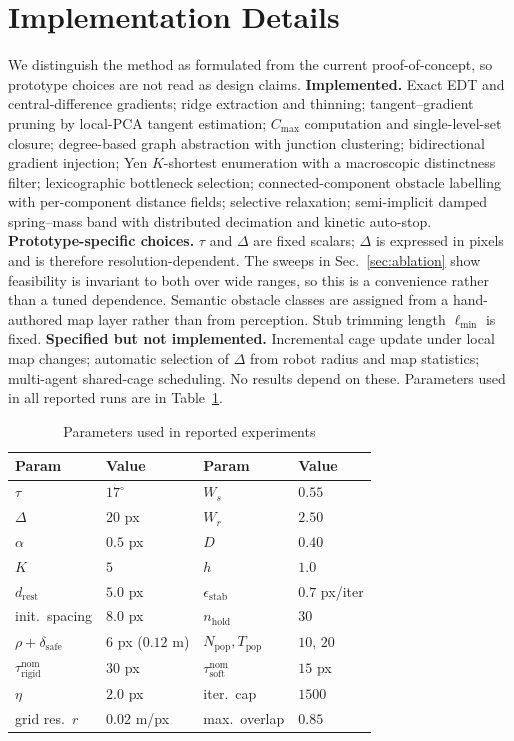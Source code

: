 \documentclass[conference]{IEEEtran}
\begin{document}
\section{Implementation Details}
\label{sec:impl}
We distinguish the method as formulated from the current proof-of-concept, so prototype choices are not read as design claims.
\textbf{Implemented.} Exact EDT and central-difference gradients; ridge extraction and thinning; tangent--gradient pruning by local-PCA tangent estimation; $C_{\max}$ computation and single-level-set closure; degree-based graph abstraction with junction clustering; bidirectional gradient injection; Yen $K$-shortest enumeration with a macroscopic distinctness filter; lexicographic bottleneck selection; connected-component obstacle labelling with per-component distance fields; selective relaxation; semi-implicit damped spring--mass band with distributed decimation and kinetic auto-stop.
\textbf{Prototype-specific choices.} $\tau$ and $\Delta$ are fixed scalars; $\Delta$ is expressed in pixels and is therefore resolution-dependent. The sweeps in Sec.~\ref{sec:ablation} show feasibility is invariant to both over wide ranges, so this is a convenience rather than a tuned dependence. Semantic obstacle classes are assigned from a hand-authored map layer rather than from perception. Stub trimming length $\ell_{\min}$ is fixed.
\textbf{Specified but not implemented.} Incremental cage update under local map changes; automatic selection of $\Delta$ from robot radius and map statistics; multi-agent shared-cage scheduling. No results depend on these.
Parameters used in all reported runs are in Table~\ref{tab:params}.
\begin{table}[htbp]
\caption{Parameters used in reported experiments}
\label{tab:params}
\begin{center}
\begin{tabular}{@{}llll@{}}
\toprule
\textbf{Param} & \textbf{Value} & \textbf{Param} & \textbf{Value} \\ \midrule
$\tau$ & $17^\circ$ & $W_s$ & $0.55$ \\
$\Delta$ & $20$ px & $W_r$ & $2.50$ \\
$\alpha$ & $0.5$ px & $D$ & $0.40$ \\
$K$ & $5$ & $h$ & $1.0$ \\
$d_{\mathrm{rest}}$ & $5.0$ px & $\epsilon_{\mathrm{stab}}$ & $0.7$ px/iter \\
init.\ spacing & $8.0$ px & $n_{\mathrm{hold}}$ & $30$ \\
$\rho+\delta_{\mathrm{safe}}$ & $6$ px ($0.12$ m) & $N_{\mathrm{pop}},T_{\mathrm{pop}}$ & $10,\,20$ \\
$\tau^{\mathrm{nom}}_{\mathrm{rigid}}$ & $30$ px & $\tau^{\mathrm{nom}}_{\mathrm{soft}}$ & $15$ px \\
$\eta$ & $2.0$ px & iter.\ cap & $1500$ \\
grid res.\ $r$ & $0.02$ m/px & max.\ overlap & $0.85$ \\ \bottomrule
\end{tabular}
\end{center}
\end{table}
\end{document}
